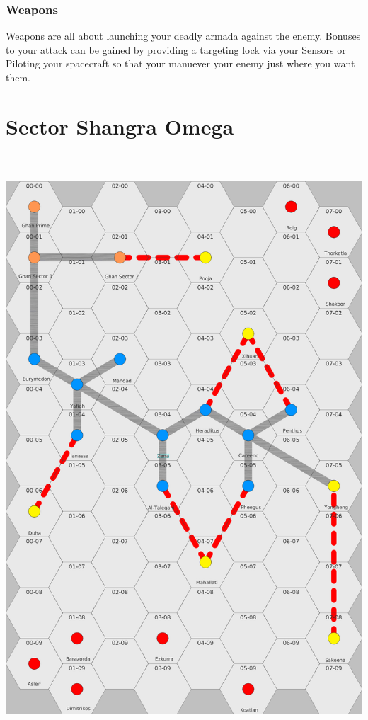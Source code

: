 \documentclass[10pt,twoside]{article}
\begin{document}
\begin{multicols}{2}
  \subsubsection{Weapons}
  
  Weapons are all about launching your deadly armada against the enemy. Bonuses to your attack can be gained by providing a targeting lock via your Sensors or Piloting your spacecraft so that your manuever your enemy just where you want them.
  
  \end{multicols}

  \newpage


  \section{Sector Shangra Omega}

  \begin{center}
    \includegraphics[height=220mm]{sectormap}
  \end{center}
\end{document}
